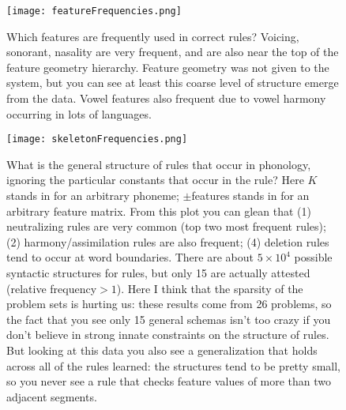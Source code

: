 \documentclass{article}
\begin{document}
\begin{figure}[h]
  \texttt{[image: featureFrequencies.png]}
  \caption{Which features are frequently used in correct rules? Voicing, sonorant, nasality are very frequent, and are also near the top of the feature geometry hierarchy. Feature geometry was not given to the system, but you can see at least this coarse level of structure emerge from the data. Vowel features also frequent due to vowel harmony occurring in lots of languages.}
\end{figure}

\begin{figure}[h]
  \texttt{[image: skeletonFrequencies.png]}
  \caption{What is the general structure of rules that occur in phonology, ignoring the particular constants that occur in the rule? Here $K$ stands in for an arbitrary phoneme; $\pm$features stands in for an arbitrary feature matrix. From this plot you can glean that (1) neutralizing rules are very common (top two most frequent rules); (2) harmony/assimilation rules are also frequent; (4) deletion rules tend to occur at word boundaries. There are about $5\times 10^4$ possible syntactic structures for rules, but only 15 are actually attested (relative frequency$ > 1$). Here I think that the sparsity of the problem sets is hurting us: these results come from 26 problems, so the fact that you see only 15 general schemas isn't too crazy if you don't believe in strong innate constraints on the structure of rules. But looking at this data you also see a generalization that holds across all of the rules learned: the structures tend to be pretty small, so you never see a rule that checks feature values of more than two adjacent segments.}
\end{figure}





\end{document}
